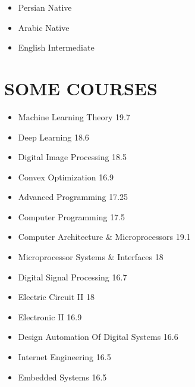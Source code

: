 \documentclass[10pt,a4paper,sans]{moderncv} %
\begin{document}
\begin{itemize}
	\item Persian \hspace{5 pt} Native
	\item Arabic \hspace{8 pt}  Native
	\item English \hspace{6 pt} Intermediate
\end{itemize} 


\section{SOME COURSES}

\begin{multicols}{2} 
	\begin{itemize}
		
		\item Machine Learning Theory               	 \hfill{19.7} 
		\item Deep Learning               	 			 \hfill{18.6}
		\item Digital Image Processing               	 \hfill{18.5} 
		\item Convex Optimization               		 \hfill{16.9} 
		
		\item Advanced Programming                    	 \hfill{17.25}
		\item Computer Programming               		 \hfill{17.5}  
		\item Computer Architecture \& Microprocessors   \hfill{19.1}
		\item Microprocessor Systems \& Interfaces		 \hfill{18}
		\item Digital Signal Processing					 \hfill{16.7}
		\item Electric Circuit II                      	 \hfill{18}   
		\item Electronic II                              \hfill{16.9}
		\item Design Automation Of Digital Systems		 \hfill{16.6}
		\item Internet Engineering						 \hfill{16.5}
		\item Embedded Systems 							 \hfill{16.5}
		
	\end{itemize}
	
\end{multicols}
\end{document}
